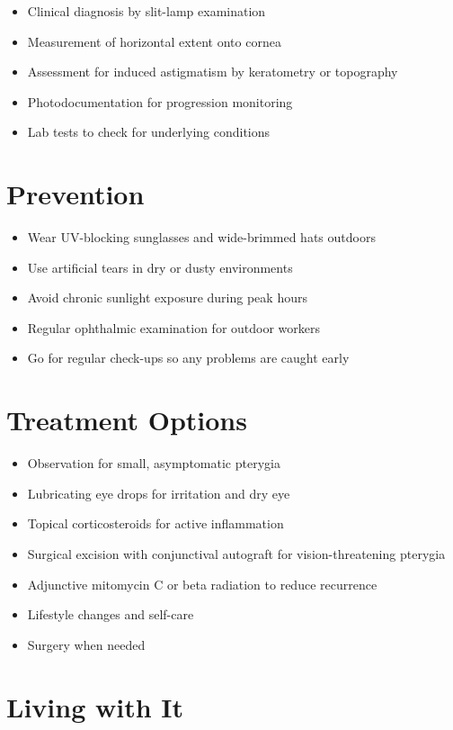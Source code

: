 \begin{itemize}[noitemsep]
  \item Clinical diagnosis by slit-lamp examination
  \item Measurement of horizontal extent onto cornea
  \item Assessment for induced astigmatism by keratometry or topography
  \item Photodocumentation for progression monitoring
  \item Lab tests to check for underlying conditions
\end{itemize}

\section{Prevention}

\begin{itemize}[noitemsep]
  \item Wear UV-blocking sunglasses and wide-brimmed hats outdoors
  \item Use artificial tears in dry or dusty environments
  \item Avoid chronic sunlight exposure during peak hours
  \item Regular ophthalmic examination for outdoor workers
  \item Go for regular check-ups so any problems are caught early
\end{itemize}

\section{Treatment Options}

\begin{itemize}[noitemsep]
  \item Observation for small, asymptomatic pterygia
  \item Lubricating eye drops for irritation and dry eye
  \item Topical corticosteroids for active inflammation
  \item Surgical excision with conjunctival autograft for vision-threatening pterygia
  \item Adjunctive mitomycin C or beta radiation to reduce recurrence
  \item Lifestyle changes and self-care
  \item Surgery when needed
\end{itemize}

\section{Living with It}

